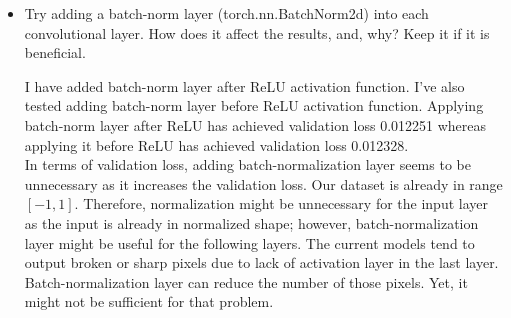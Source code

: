 \documentclass[12pt]{article}
\begin{document}
    \begin{itemize}
        \item Try adding a batch-norm layer (torch.nn.BatchNorm2d) into each convolutional layer. How does it affect the results, and, why? Keep it if it is beneficial. 
        
		\begin{minipage}{\textwidth}
			\centering
			\captionsetup{width=.8\textwidth}
		 \end{minipage}
		 
		 I have added batch-norm layer after ReLU activation function. I've also tested adding batch-norm layer before ReLU activation function. Applying batch-norm layer after ReLU has achieved validation loss 0.012251 whereas applying it before ReLU has achieved validation loss 0.012328. \\
		 In terms of validation loss, adding batch-normalization layer seems to be unnecessary as it increases the validation loss. Our dataset is already in range $[-1,1]$. Therefore, normalization might be unnecessary for the input layer as the input is already in normalized shape; however, batch-normalization layer might be useful for the following layers. The current models tend to output broken or sharp pixels due to lack of activation layer in the last layer. Batch-normalization layer can reduce the number of those pixels. Yet, it might not be sufficient for that problem.


\end{itemize}
\end{document}
